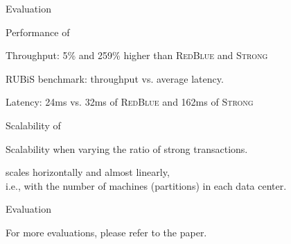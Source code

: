 
\begin{frame}{}
  \begin{center}
    {\Large Evaluation}
  \end{center}
\end{frame}

\begin{frame}{Performance of \unistore}
  \begin{center}
    Throughput: 5\% and 259\% higher than \textsc{RedBlue} and \textsc{Strong}

    \vspace{-0.20cm}
    {\small RUBiS benchmark: throughput vs. average latency.}

    \vspace{0.50cm}
    Latency: 24ms vs. 32ms of \textsc{RedBlue} and 162ms of \textsc{Strong}
  \end{center}
\end{frame}

\begin{frame}{Scalability of \unistore}
  \begin{center}
    {\small Scalability when varying the ratio of strong transactions.}

    \vspace{0.50cm}
    \unistore{} scales horizontally and almost linearly, \\[3pt]
    i.e., with the number of machines ({partitions}) in each data center.
  \end{center}
\end{frame}

\begin{frame}{Evaluation}
  \begin{center}
    For more evaluations, please refer to the paper.
  \end{center}
\end{frame}
